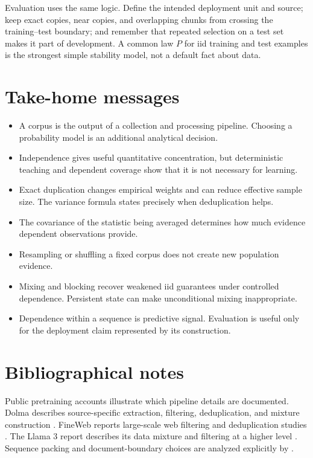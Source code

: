 \documentclass[11pt,twoside]{article}
\theoremstyle{definition}
\theoremstyle{remark}
\begin{document}
Evaluation uses the same logic. Define the intended deployment unit and source;
keep exact copies, near copies, and overlapping chunks from crossing the
training--test boundary; and remember that repeated selection on a test set
makes it part of development. A common law \(P\) for iid training and test
examples is the strongest simple stability model, not a default fact about
data.

\section{Take-home messages}
\label{sec:take-home}

\begin{itemize}[leftmargin=*]
\item A corpus is the output of a collection and processing pipeline. Choosing
  a probability model is an additional analytical decision.
\item Independence gives useful quantitative concentration, but deterministic
  teaching and dependent coverage show that it is not necessary for learning.
\item Exact duplication changes empirical weights and can reduce effective
  sample size. The variance formula states precisely when deduplication helps.
\item The covariance of the statistic being averaged determines how much
  evidence dependent observations provide.
\item Resampling or shuffling a fixed corpus does not create new population
  evidence.
\item Mixing and blocking recover weakened iid guarantees under controlled
  dependence. Persistent state can make unconditional mixing inappropriate.
\item Dependence within a sequence is predictive signal. Evaluation is useful
  only for the deployment claim represented by its construction.
\end{itemize}

\clearpage
\printendnotes

\section*{Bibliographical notes}

Public pretraining accounts illustrate which pipeline details are documented.
Dolma describes source-specific extraction, filtering, deduplication, and
mixture construction \citep{soldaini2024}. FineWeb reports large-scale web
filtering and deduplication studies \citep{penedo2024}. The Llama 3 report
describes its data mixture and filtering at a higher level
\citep{dubey2024}. Sequence packing and document-boundary choices are analyzed
explicitly by \citet{ding2024}.
\end{document}
